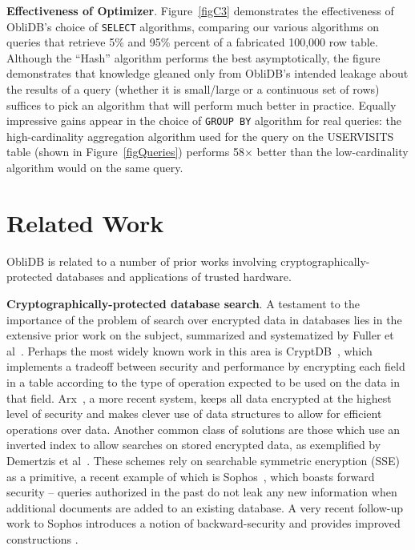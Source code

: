 \documentclass[letterpaper,twocolumn,10pt]{article}
\def\name/{ObliDB}
\begin{document}
\noindent \textbf{Effectiveness of Optimizer}. 
Figure~\ref{figC3} demonstrates the effectiveness of \name/'s choice of \texttt{SELECT} algorithms, comparing our various algorithms on queries that retrieve 5\% and 95\% percent of a fabricated 100,000 row table. Although the ``Hash'' algorithm performs the best asymptotically, the figure demonstrates that knowledge gleaned only from \name/'s intended leakage about the results of a query (whether it is small/large or a continuous set of rows) suffices to pick an algorithm that will perform much better in practice. Equally impressive gains appear in the choice of \texttt{GROUP BY} algorithm for real queries: the high-cardinality aggregation algorithm used for the query on the USERVISITS table (shown in Figure~\ref{figQueries}) performs 58$\times$ better than the low-cardinality algorithm would on the same query. 

\section{Related Work}\label{related}

\name/ is related to a number of prior works involving cryptographically-protected databases and applications of trusted hardware.

  \noindent \textbf{Cryptographically-protected database search}. 
A testament to the importance of the problem of search over encrypted data in databases lies in the extensive prior work on the subject, summarized and systematized by Fuller et al~\cite{FVY+17}. Perhaps the most widely known work in this area is CryptDB~\cite{PRZB12}, which implements a tradeoff between security and performance by encrypting each field in a table according to the type of operation expected to be used on the data in that field. Arx~\cite{PBP16}, a more recent system, keeps all data encrypted at the highest level of security and makes clever use of data structures to allow for efficient operations over data. Another common class of solutions are those which use an inverted index to allow searches on stored encrypted data, as exemplified by Demertzis et al~\cite{DPP+16}. These schemes rely on searchable symmetric encryption (SSE) as a primitive, a recent example of which is Sophos~\cite{Bost16}, which boasts forward security -- queries authorized in the past do not leak any new information when additional documents are added to an existing database. A very recent follow-up work to Sophos introduces a notion of backward-security and provides improved constructions \cite{BMO17}. 
\end{document}
